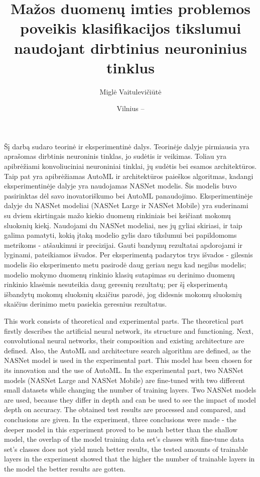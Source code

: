 \documentclass{VUMIFPSbakalaurinis}
\title{Mažos duomenų imties problemos poveikis klasifikacijos tikslumui naudojant dirbtinius neuroninius tinklus}
\author{Miglė Vaitulevičiūtė}
\date{Vilnius – \the\year}
\begin{document}
\maketitle
\cleardoublepage{}
\setcounter{page}{2}

Šį darbą sudaro teorinė ir eksperimentinė dalys. Teorinėje dalyje pirmiausia yra aprašomas dirbtinis neuroninis tinklas, jo sudėtis ir veikimas. Toliau yra apibrėžiami konvoliuciniai neuroniniai tinklai, jų sudėtis bei esamos architektūros. Taip pat yra apibrėžiamas AutoML ir architektūros paieškos algoritmas, kadangi eksperimentinėje dalyje yra naudojamas NASNet modelis. Šis modelis buvo pasirinktas dėl savo inovatoriškumo bei AutoML panaudojimo. 
Eksperimentinėje dalyje du NASNet modeliai (NASNet Large ir NASNet Mobile) yra suderinami su dviem skirtingais mažo kiekio duomenų rinkiniais bei keičiant mokomų sluoksnių kiekį. Naudojami du NASNet modeliai, nes jų gyliai skiriasi, ir taip galima pamatyti, kokią įtaką modelio gylis daro tikslumui bei papildomoms metrikoms - atšaukimui ir precizijai. 
Gauti bandymų rezultatai apdorojami ir lyginami, pateikiamos išvados. Per eksperimentą padarytos trys išvados - gilesnis modelis šio eksperimento metu pasirodė daug geriau negu kad negilus modelis; modelio mokymo duomenų rinkinio klasių sutapimas su derinimo duomenų rinkinio klasėmis nesuteikia daug geresnių rezultatų; per šį eksperimentą išbandytų mokomų sluoksnių skaičius parodė, jog didesnis mokomų sluoksnių skaičius derinimo metu pasiekia geresnius rezultatus.


This work consists of theoretical and experimental parts.  The theoretical part firstly describes the artificial neural network, its structure and functioning. Next, convolutional neural networks, their composition and existing architecture are defined. Also, the AutoML and architecture search algorithm are defined, as the NASNet model is used in the experimental part. This model has been chosen for its innovation and the use of AutoML.
In the experimental part, two NASNet models (NASNet Large and NASNet Mobile) are fine-tuned with two different small datasets while changing the number of training layers. Two NASNet models are used, because they differ in depth and can be used to see the impact of model depth on accuracy. 
The obtained test results are processed and compared, and conclusions are given. In the experiment, three conclusions were made - the deeper model in this experiment proved to be much better than the shallow model, the overlap of the model training data set's classes with fine-tune data set's classes does not yield much better results, the tested amounts of trainable layers in the experiment showed that the higher the number of trainable layers in the model the better results are gotten.
\end{document}
